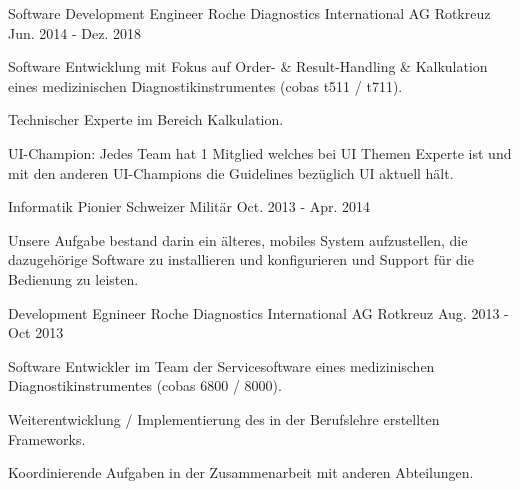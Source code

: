 

\begin{cventries}

  \cventry
    {Software Development Engineer} %
    {Roche Diagnostics International AG} %
    {Rotkreuz} %
    {Jun. 2014 - Dez. 2018} %
    {
      \begin{cvitems} %
      	\item {Software Entwicklung mit Fokus auf Order- \& Result-Handling \& Kalkulation eines medizinischen Diagnostikinstrumentes (cobas t511 / t711).}
        \item {Technischer Experte im Bereich Kalkulation.}
        \item {UI-Champion: Jedes Team hat 1 Mitglied welches bei UI Themen Experte ist und mit den anderen UI-Champions die Guidelines bezüglich UI aktuell hält.}
      \end{cvitems}
    }

  \cventry
    {Informatik Pionier} %
    {Schweizer Militär} %
    {} %
    {Oct. 2013 - Apr. 2014} %
    {
      \begin{cvitems} %
        \item {Unsere Aufgabe bestand darin ein älteres, mobiles System aufzustellen, die dazugehörige Software zu installieren und konfigurieren und Support für die Bedienung zu leisten.}
      \end{cvitems}
    }

  \cventry
    {Development Egnineer} %
    {Roche Diagnostics International AG} %
    {Rotkreuz} %
    {Aug. 2013 - Oct 2013} %
    {
      \begin{cvitems} %
        \item {Software Entwickler im Team der Servicesoftware eines medizinischen Diagnostikinstrumentes (cobas 6800 / 8000).}
        \item {Weiterentwicklung / Implementierung des in der Berufslehre erstellten Frameworks.}
        \item {Koordinierende Aufgaben in der Zusammenarbeit mit anderen Abteilungen.}
      \end{cvitems}
    }

\end{cventries}

